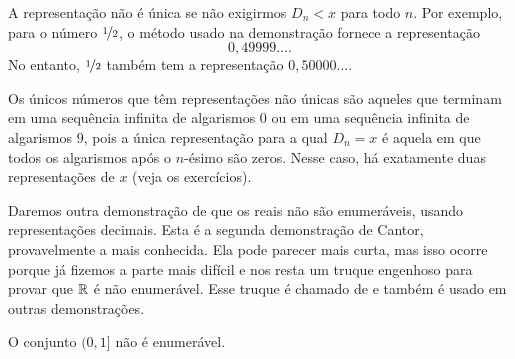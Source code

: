 A representação não é única se não exigirmos
$D_n < x$ para todo $n$.
Por exemplo, para o
número $\nicefrac{1}{2}$, o método usado na demonstração fornece a representação
\begin{equation*}
0{,}49999\ldots .
\end{equation*}
No entanto, $\nicefrac{1}{2}$ também tem a representação $0{,}50000\ldots$.

Os únicos números que têm representações não únicas são aqueles que terminam
em uma sequência infinita de algarismos $0$
ou em uma sequência infinita de algarismos $9$, pois a única representação para a qual
$D_n = x$ é aquela em que todos os algarismos após o $n$-ésimo são zeros.
Nesse caso,
há exatamente duas representações de $x$ (veja os exercícios).

Daremos outra demonstração de que os reais não são enumeráveis, usando
representações decimais.
Esta é a segunda demonstração de Cantor, provavelmente a mais conhecida.
Ela pode parecer mais curta, mas isso ocorre porque já fizemos
a parte mais difícil e nos resta um truque engenhoso para provar que ${\mathbb{R}}$ é
não enumerável. Esse truque é chamado de
\emph{} e
também é usado em outras demonstrações.

\begin{thm}[Cantor]
O conjunto $(0,1]$ não é enumerável.
\end{thm}


